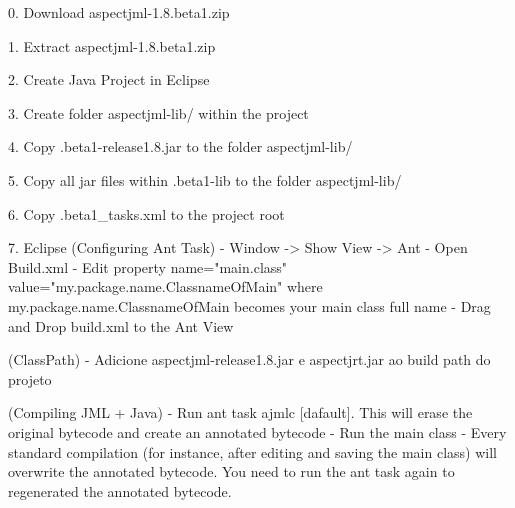 0. Download aspectjml-1.8.beta1.zip

1. Extract aspectjml-1.8.beta1.zip

2. Create Java Project in Eclipse

3. Create folder aspectjml-lib/ within the project

4. Copy .beta1\bin\aspectjml-release1.8.jar to the folder aspectjml-lib/

5. Copy all jar files within .beta1\aspectjml-lib to the folder aspectjml-lib/

6. Copy .beta1\ant_tasks\build.xml to the project root

7. Eclipse
    (Configuring Ant Task)
        - Window -> Show View -> Ant
        - Open Build.xml
        - Edit
            property name="main.class"           value="my.package.name.ClassnameOfMain"
          where my.package.name.ClassnameOfMain becomes your main class full name
        - Drag and Drop build.xml to the Ant View

    (ClassPath)
        - Adicione aspectjml-release1.8.jar e aspectjrt.jar ao build path do projeto

    (Compiling JML + Java)
        - Run ant task ajmlc [dafault]. This will erase the original bytecode and create an annotated bytecode
        - Run the main class
        - Every standard compilation (for instance, after editing and saving the main class) will overwrite the annotated bytecode. You need to run the ant task again to regenerated the annotated bytecode.

